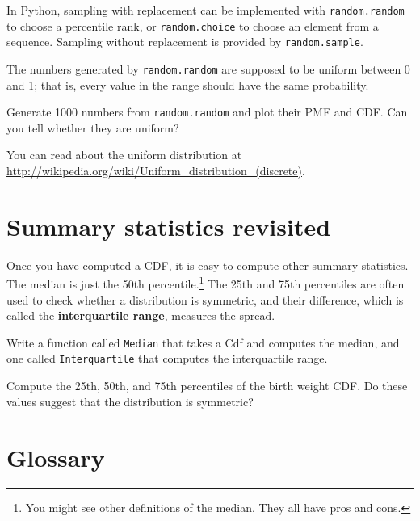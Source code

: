 \documentclass[12pt]{book}
\begin{document}
In Python, sampling with replacement can be implemented with
{\tt random.random} to choose a percentile rank, or {\tt random.choice}
to choose an element from a sequence.  Sampling without replacement
is provided by {\tt random.sample}.

\begin{exercise}
The numbers generated by {\tt random.random} are supposed to be
uniform between 0 and 1; that is, every value in the range
should have the same probability.

Generate 1000 numbers from {\tt random.random} and plot their
PMF and CDF.  Can you tell whether they are uniform?

You can read about the uniform distribution at
\url{http://wikipedia.org/wiki/Uniform_distribution_(discrete)}.

\end{exercise}


\section{Summary statistics revisited}

Once you have computed a CDF, it is easy to compute other summary
statistics.  The median is just the 50th percentile.\footnote{You might
see other definitions of the median.  They all have pros and cons.}
The 25th and 75th percentiles are often used to check whether
a distribution is symmetric, and their difference, which is called
the {\bf interquartile range}, measures the spread.

\begin{exercise}
Write a function called {\tt Median} that takes a Cdf and computes the
median, and one called {\tt Interquartile} that computes
the interquartile range.

Compute the 25th, 50th, and 75th percentiles of the birth weight
CDF.  Do these values suggest that the distribution is symmetric?

\end{exercise}


\section{Glossary}
\end{document}
